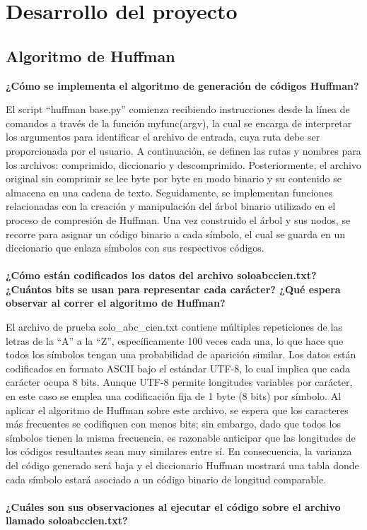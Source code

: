 \documentclass[conference,onecolumn,12pt]{IEEEtran}
\numberwithin{equation}{subsection}
\begin{document}
\section{Desarrollo del proyecto}

\subsection{Algoritmo de Huffman}

\textbf{¿Cómo se implementa el algoritmo de generación de códigos Huffman?}


El script “huffman base.py” comienza recibiendo instrucciones desde la línea de comandos a través de la función myfunc(argv), la cual se encarga de interpretar los argumentos para identificar el archivo de entrada, cuya ruta debe ser proporcionada por el usuario. A continuación, se definen las rutas y nombres para los archivos: comprimido, diccionario y descomprimido. Posteriormente, el archivo original sin comprimir se lee byte por byte en modo binario y su contenido se almacena en una cadena de texto. Seguidamente, se implementan funciones relacionadas con la creación y manipulación del árbol binario utilizado en el proceso de compresión de Huffman. Una vez construido el árbol y sus nodos, se recorre para asignar un código binario a cada símbolo, el cual se guarda en un diccionario que enlaza símbolos con sus respectivos códigos.
\\
\\
\textbf{¿Cómo están codificados los datos del archivo solo\textunderscore abc\textunderscore cien.txt? ¿Cuántos bits se usan para representar cada carácter? ¿Qué espera observar al correr el algoritmo de Huffman?}

El archivo de prueba solo_abc_cien.txt contiene múltiples repeticiones de las letras de la “A” a la “Z”, específicamente 100 veces cada una, lo que hace que todos los símbolos tengan una probabilidad de aparición similar. Los datos están codificados en formato ASCII bajo el estándar UTF-8, lo cual implica que cada carácter ocupa 8 bits. Aunque UTF-8 permite longitudes variables por carácter, en este caso se emplea una codificación fija de 1 byte (8 bits) por símbolo. Al aplicar el algoritmo de Huffman sobre este archivo, se espera que los caracteres más frecuentes se codifiquen con menos bits; sin embargo, dado que todos los símbolos tienen la misma frecuencia, es razonable anticipar que las longitudes de los códigos resultantes sean muy similares entre sí. En consecuencia, la varianza del código generado será baja y el diccionario Huffman mostrará una tabla donde cada símbolo estará asociado a un código binario de longitud comparable.
\\
\\
\textbf{¿Cuáles son sus observaciones al ejecutar el código sobre el archivo llamado solo\textunderscore abc\textunderscore cien.txt?}
\end{document}

